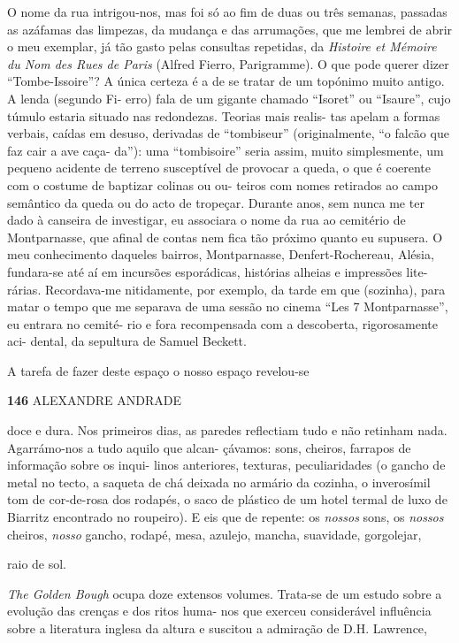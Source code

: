 O nome da rua intrigou-nos, mas foi só ao fim de duas ou três semanas,
passadas as azáfamas das limpezas, da mudança e das arrumações, que me
lembrei de abrir o meu exemplar, já tão gasto pelas consultas repetidas,
da \emph{Histoire et Mémoire du Nom des Rues de Paris }(Alfred Fierro,
Parigramme). O que pode querer dizer ``Tombe-Issoire''? A única certeza
é a de se tratar de um topónimo muito antigo. A lenda (segundo Fi- erro)
fala de um gigante chamado ``Isoret'' ou ``Isaure'', cujo túmulo estaria
situado nas redondezas. Teorias mais realis- tas apelam a formas
verbais, caídas em desuso, derivadas de ``tombiseur'' (originalmente,
``o falcão que faz cair a ave caça- da''): uma ``tombisoire'' seria
assim, muito simplesmente, um pequeno acidente de terreno susceptível de
provocar a queda, o que é coerente com o costume de baptizar colinas ou
ou- teiros com nomes retirados ao campo semântico da queda ou do acto de
tropeçar. Durante anos, sem nunca me ter dado à canseira de investigar,
eu associara o nome da rua ao cemitério de Montparnasse, que afinal de
contas nem fica tão próximo quanto eu supusera. O meu conhecimento
daqueles bairros, Montparnasse, Denfert-Rochereau, Alésia, fundara-se
até aí em incursões esporádicas, histórias alheias e impressões lite-
rárias. Recordava-me nitidamente, por exemplo, da tarde em que
(sozinha), para matar o tempo que me separava de uma sessão no cinema
``Les 7 Montparnasse'', eu entrara no cemité- rio e fora recompensada
com a descoberta, rigorosamente aci- dental, da sepultura de Samuel
Beckett.

A tarefa de fazer deste espaço o nosso espaço revelou-se

\textbf{146 }ALEXANDRE ANDRADE

doce e dura. Nos primeiros dias, as paredes reflectiam tudo e não
retinham nada. Agarrámo-nos a tudo aquilo que alcan- çávamos: sons,
cheiros, farrapos de informação sobre os inqui- linos anteriores,
texturas, peculiaridades (o gancho de metal no tecto, a saqueta de chá
deixada no armário da cozinha, o inverosímil tom de cor-de-rosa dos
rodapés, o saco de plástico de um hotel termal de luxo de Biarritz
encontrado no roupeiro). E eis que de repente: os \emph{nossos }sons, os
\emph{nossos }cheiros, \emph{nosso }gancho, rodapé, mesa, azulejo,
mancha, suavidade, gorgolejar,

raio de sol.

\emph{The Golden Bough }ocupa doze extensos volumes. Trata-se de um
estudo sobre a evolução das crenças e dos ritos huma- nos que exerceu
considerável influência sobre a literatura inglesa da altura e suscitou
a admiração de D.H. Lawrence,

